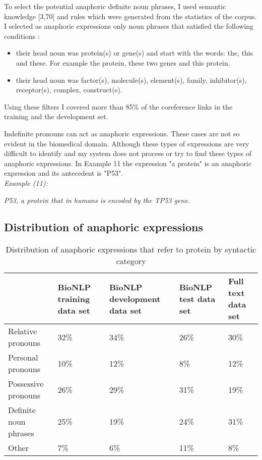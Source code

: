 To select the potential anaphoric definite noun phrases, I used semantic knowledge [3,70] and  rules which were generated from the statistics of the corpus. I selected as anaphoric expressions only noun phrases that satisfied the following conditions :

\begin{itemize}
	\item their head noun was protein(s) or gene(s) and start with the words: the, this and these. For example the protein, these two genes and this protein.
	\item their head noun was factor(s), molecule(s), element(s), family, inhibitor(s), receptor(s), complex, construct(s). 
\end{itemize}

Using these filters I covered more than 85\% of the coreference links in the training and the development set.

Indefinite pronouns can act as anaphoric expressions. These cases are not so evident in the biomedical domain. Although these types of expressions are very difficult to identify and my system does not process or try to find these types of anaphoric expressions. In Example 11 the expression "a protein" is an anaphoric expression and its antecedent is "P53". \\
\newpage
\emph{Example (11):}
\begin{changemargin}{10mm}{10mm} 
  \emph{P53, a protein that in humans is encoded by the TP53 gene.}  
\end{changemargin} 
\vspace{4mm}

\subsection{Distribution of anaphoric expressions}
\begin{table}[h]
   \begin{center}
	 \begin{tabular}{|l | C{2cm} C{2cm} C{2cm} C{2cm}|}
 		\hline
  		& BioNLP training data set & BioNLP development data set & BioNLP test data set &Full text data set\\
 		\hline
 		Relative pronouns & 32\% & 34\% & 26\% & 30\% \\
 		\hline 
 		Personal pronouns & 10\% & 12\% & 8\% &12\% \\
 		\hline   
 		Possessive pronouns & 26\% & 29\% & 31\% &19\% \\
 		\hline  
 		Definite noun phrases & 25\% & 19\% & 24\% & 31\% \\
 		\hline  
 		Other & 7\% & 6\% & 11\% &8\% \\
 		\hline   
	\end{tabular}
  \end{center} 
  \caption{ Distribution of anaphoric expressions that refer to protein by  syntactic category}
\end{table}
  
